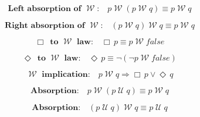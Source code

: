 \documentclass[12pt, fleqn, leqno]{article}
\newcommand{\impl}{\ensuremath{\Rightarrow}}        %
\newcommand{\Until}{\;\mathcal{U}\;}
\newcommand{\Wait}{\;\mathcal{W}\;}
\newcommand{\Event}{\Diamond\,}
\newcommand{\Always}{\Box\,}
\newcommand{\spacer}{\vspace{-30pt}}
\begin{document}
\begin{equation}\label{E:waitAbsL}
\textbf{Left absorption of $\Wait$:}\quad p \Wait (p \Wait q) \equiv p \Wait q
\end{equation}

\spacer

\begin{equation}\label{E:waitAbsR}
\textbf{Right absorption of $\Wait$:}\quad (p \Wait q) \Wait q \equiv p \Wait q
\end{equation}

\spacer

\begin{equation}\label{E:alwaysAsWait}
\textbf{$\Always$ to $\Wait$ law:}\quad \Always p \equiv p \Wait false
\end{equation}

\spacer

\begin{equation}\label{E:eventAsWait}
\textbf{$\Event$ to $\Wait$ law:}\quad \Event p \equiv \neg(\neg p \Wait false)
\end{equation}

\spacer

\begin{equation}\label{E:waitEntailment}
\textbf{$\Wait$ implication:}\quad p \Wait q \impl \Always p\lor \Event q
\end{equation}

\spacer

\begin{equation}\label{E:leftWaitAbsUtil}
\textbf{Absorption:}\quad p \Wait (p \Until q) \equiv p \Wait q
\end{equation}

\spacer

\begin{equation}\label{E:rightWaitAbsUtil}
\textbf{Absorption:}\quad (p \Until q) \Wait q \equiv p \Until q
\end{equation}
\end{document}
